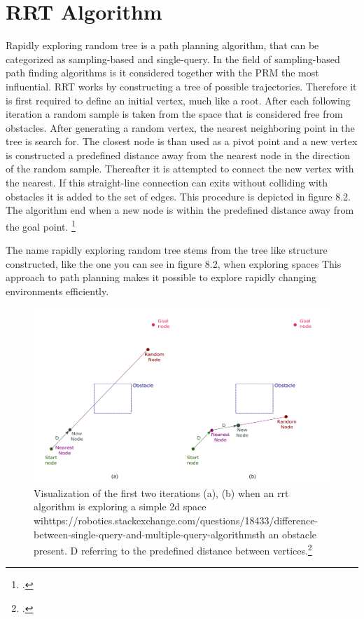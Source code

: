 \section{RRT Algorithm}

Rapidly exploring random tree is a path planning algorithm, that can be categorized as sampling-based and single-query. In the field of sampling-based path finding algorithms is it considered together with the PRM the most influential. RRT works by constructing a tree of possible trajectories. Therefore it is first required to define an initial vertex, much like a root. After each following iteration a random sample is taken from the space that is considered free from obstacles. After generating a random vertex, the nearest neighboring point in the tree is search for. The closest node is than used as a pivot point and a new vertex is constructed a predefined distance away from the nearest node in the direction of the random sample. Thereafter it is attempted to connect the new vertex with the nearest. If this straight-line connection can exits without colliding with obstacles it is added to the set of edges. This procedure is depicted in figure 8.2. The algorithm end when a new node is within the predefined distance away from the goal point. 
\footcite{Karaman2011}

The name rapidly exploring random tree stems from the tree like structure constructed, like the one you can see in figure 8.2, when exploring spaces This approach to path planning makes it possible to explore rapidly changing environments efficiently.


\begin{figure}[h]
	\centering
	\includegraphics[width=0.9\linewidth]{img/rrtIteration}
	\caption{Visualization of the first two iterations (a), (b) when an rrt algorithm is exploring a simple 2d space wihttps://robotics.stackexchange.com/questions/18433/difference-between-single-query-and-multiple-query-algorithmsth an obstacle present. D referring to the predefined distance between vertices.\footcite{Zammit2018}}
	\label{fig:path_planning_rrt}
\end{figure}

